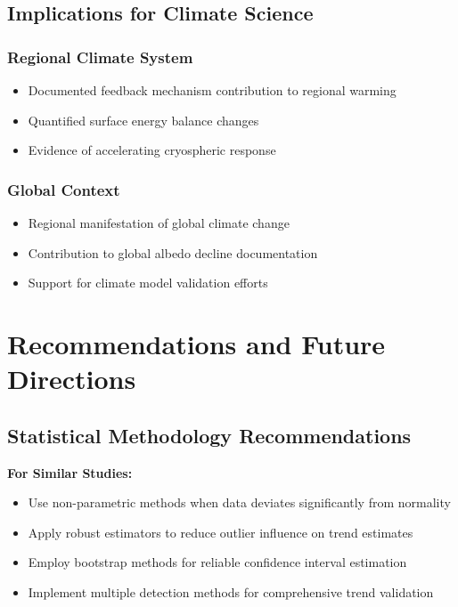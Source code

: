 \documentclass[12pt,a4paper]{article}
\begin{document}
\subsection{Implications for Climate Science}

\subsubsection{Regional Climate System}
\begin{itemize}
    \item Documented feedback mechanism contribution to regional warming
    \item Quantified surface energy balance changes
    \item Evidence of accelerating cryospheric response
\end{itemize}

\subsubsection{Global Context}
\begin{itemize}
    \item Regional manifestation of global climate change
    \item Contribution to global albedo decline documentation
    \item Support for climate model validation efforts
\end{itemize}

\section{Recommendations and Future Directions}

\subsection{Statistical Methodology Recommendations}

\textbf{For Similar Studies:}
\begin{itemize}
    \item Use non-parametric methods when data deviates significantly from normality
    \item Apply robust estimators to reduce outlier influence on trend estimates
    \item Employ bootstrap methods for reliable confidence interval estimation
    \item Implement multiple detection methods for comprehensive trend validation
\end{itemize}
\end{document}
